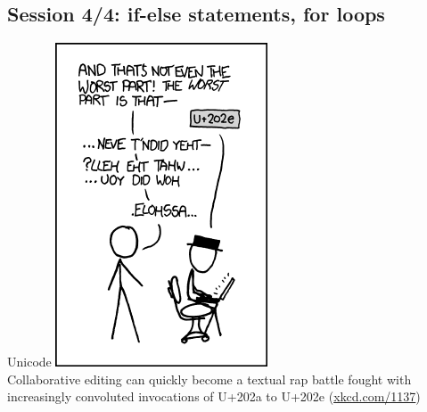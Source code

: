\documentclass[xcolor=table,           xcolor=dvipsnames]{beamer}\usepackage[]{graphicx}\usepackage[]{color}
\begin{document}


\subsection{Session 4/4: if-else statements, for loops}

\begin{frame}{Unicode}
\center \includegraphics[height=0.65\textheight]{externalfig/rtl.png}\\
Collaborative editing can quickly become a textual rap battle fought with increasingly convoluted invocations of U+202a to U+202e (\href{https://xkcd.com/1137/}{xkcd.com/1137})
\end{frame}

\end{document}
